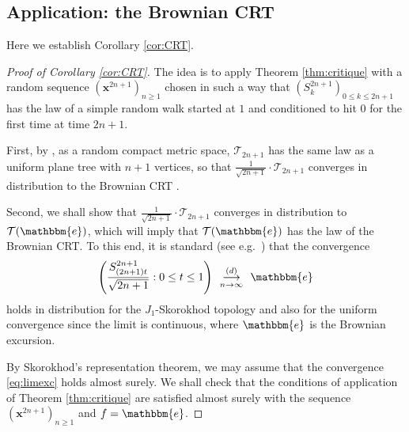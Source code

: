 \documentclass[11pt]{article}
\theoremstyle{plain}
\theoremstyle{definition}
\theoremstyle{remark}
\newcommand{\1}{\mathbbm{1}} %
\newcommand{\T}{\mathcal{T}} %
\newcommand{\Xb}{\mathrm{\mathbf{x}}} %
\newcommand{\cvloi}[1][n]{\enskip\mathop{\longrightarrow}^{(d)}_{#1 \to \infty}\enskip}
\let\originalleft\left
\let\originalright\right
\renewcommand{\left}{\mathopen{}\mathclose\bgroup\originalleft}
\renewcommand{\right}{\aftergroup\egroup\originalright}
\begin{document}
\subsection{Application: the Brownian CRT}
\label{ssec:CRT}

Here we establish Corollary \ref{cor:CRT}. 








\begin{proof}[Proof of Corollary \ref{cor:CRT}]
The idea is to apply Theorem \ref{thm:critique} with a random sequence $(\Xb^{2n+1})_{n \geq 1}$ chosen in such a way that  {$(S^{2n+1}_{k})_{0 \leq k \leq 2n+1}$} has the law of a simple random walk started at $1$ and conditioned to hit $0$ for the first time at time $2n+1$.

First, by \cite[Theorem 2]{BBKK23+}, as a random compact metric space, $\T_{2n+1}$ has the same law as a uniform plane tree with $n+1$ vertices, so that $\frac{1}{\sqrt{2n+1}} \cdot \T_{2n+1}$ converges in distribution to the Brownian CRT \cite{Ald93}.

{Second, we shall show that  $\frac{1}{\sqrt{2n+1}} \cdot \T_{2n+1}$ converges in distribution to $ \mathcal{T}(\mathbbm{e})$, which will imply that $ \mathcal{T}(\mathbbm{e})$ has the law of the Brownian CRT. To this end,  it is standard (see e.g.~\cite{Kai76}) that the convergence
\begin{equation}
\label{eq:limexc} \left( \frac{S^{2n+1}_{(2n+1)t} }{\sqrt{2n+1}}  : 0 \leq t \leq 1 \right) \cvloi \mathbbm{e}
\end{equation}
holds in distribution for the $J_1$-Skorokhod topology and also for the uniform convergence since the limit is continuous, where $\mathbbm{e}$ is the Brownian excursion.}








{ By Skorokhod's representation theorem, we may assume that the convergence \eqref{eq:limexc} holds almost surely. We shall check that the conditions of application of Theorem \ref{thm:critique} are satisfied almost surely with the sequence $(\Xb^{2n+1})_{n \geq 1}$ and $f=\mathbbm{e}$.}


\end{proof}
\end{document}
